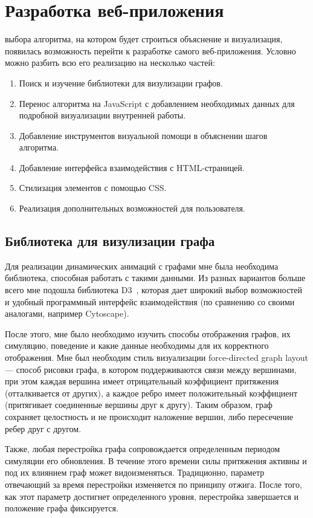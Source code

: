 \documentclass[a4paper,12pt]{extarticle}
\begin{document}
\section{Разработка веб-приложения}
 выбора алгоритма, на котором будет строиться объяснение и визуализация, появилась возможность перейти к разработке самого веб-приложения. Условно можно разбить всю его реализацию на несколько частей:
\begin{enumerate}
    \item Поиск и изучение библиотеки для визулизации графов.
    \item Перенос алгоритма на JavaScript с добавлением необходимых данных для подробной визуализации внутренней работы.
    \item Добавление инструментов визуальной помощи в объяснении шагов алгоритма.
    \item Добавление интерфейса взаимодействия с HTML-страницей.
    \item Стилизация элементов с помощью CSS.
    \item Реализация дополнительных возможностей для пользователя.
\end{enumerate}

\subsection{Библиотека для визулизации графа}
Для реализации динамических анимаций с графами мне была необходима библиотека, способная работать с такими данными. Из разных вариантов больше всего мне подошла библиотека D3~\cite{d3}, которая дает широкий выбор возможностей и удобный программный интерфейс взаимодействия (по сравнению со своими аналогами, например Cytoscape).\par
После этого, мне было необходимо изучить способы отображения графов, их симуляцию, поведение и какие данные необходимы для их корректного отображения. Мне был необходим стиль визуализации force-directed graph layout — способ рисовки графа, в котором поддерживаются связи между вершинами, при этом каждая вершина имеет отрицательный коэффициент притяжения (отталкивается от других), а каждое ребро имеет положительный коэффициент (притягивает соединенные вершины друг к другу). Таким образом, граф сохраняет целостность и не происходит наложение вершин, либо пересечение ребер друг с другом.\par
Также, любая перестройка графа сопровождается определенным периодом симуляции его обновления. В течение этого времени силы притяжения активны и под их влиянием граф может видоизменяться. Традиционно, параметр отвечающий за время перестройки изменяется по принципу отжига. После того, как этот параметр достигнет определенного уровня, перестройка завершается и положение графа фиксируется.
\end{document}
